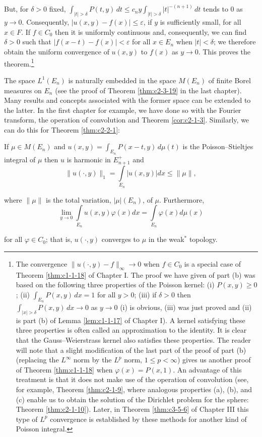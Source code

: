 But, for $\delta > 0$ fixed, $\int_{|t| > \delta} P(t, y) \, dt \leq c_n y \int_{|t| > \delta} |t|^{-(n+1)} \, dt$ tends to 0 as $y \to 0$. Consequently, $|u(x, y) - f(x)| \leq \varepsilon$, if $y$ is sufficiently small, for all $x \in F$. If $f \in C_0$ then it is uniformly continuous and, consequently, we can find $\delta > 0$ such that $|f(x-t) - f(x)| < \varepsilon$ for all $x \in E_n$ when $|t| < \delta$; we therefore obtain the uniform convergence of $u(x, y)$ to $f(x)$ as $y \to 0$. This proves the theorem.\footnote{The convergence $\|u(\cdot, y) - f\|_\infty \to 0$ when $f \in C_0$ is a special case of Theorem \ref{thm:c1-1-18} of Chapter I. The proof we have given of part (b) was based on the following three properties of the Poisson kernel: (i) $P(x, y) \geq 0$; (ii) $\int_{E_n} P(x, y) \, dx = 1$ for all $y > 0$; (iii) if $\delta > 0$ then $\int_{|x| > \delta} P(x, y) \, dx \to 0$ as $y \to 0$ (i) is obvious, (iii) was just proved and (ii) is part (b) of Lemma \ref{lem:c1-1-17} of Chapter I). A kernel satisfying these three properties is often called an approximation to the identity. It is clear that the Gauss--Weierstrass kernel also satisfies these properties. The reader will note that a slight modification of the last part of the proof of part (b) (replacing the $L^\infty$ norm by the $L^p$ norm, $1 \leq p < \infty$) gives us another proof of Theorem \ref{thm:c1-1-18} when $\varphi(x) = P(x, 1)$. An advantage of this treatment is that it does not make use of the operation of convolution (see, for example, Theorem \ref{thm:c2-1-9}, where analogous properties (a), (b), and (c) enable us to obtain the solution of the Dirichlet problem for the sphere: Theorem \ref{thm:c2-1-10}). Later, in Theorem \ref{thm:c3-5-6} of Chapter III this type of $L^p$ convergence is established by these methods for another kind of Poisson integral.}

The space $L^{1}(E_{n})$ is naturally embedded in the space $M(E_{n})$ of finite Borel measures on $E_{n}$ (see the proof of Theorem \ref{thm:c2-3-19} in the last chapter). Many results and concepts associated with the former space can be extended to the latter. In the first chapter for example, we have done so with the Fourier transform, the operation of convolution and Theorem \ref{cor:c2-1-3}. Similarly, we can do this for Theorem \ref{thm:c2-2-1}:

\begin{theorem}
\label{thm:c2-2-3}
If $\mu \in M(E_n)$ and $u(x, y) = \int_{E_n} P(x - t, y) \, d\mu(t)$ is the Poisson--Stieltjes integral of $\mu$ then $u$ is harmonic in $E_{n+1}^{+}$ and
\begin{equation}\label{eq:c2-2-4}
\|u(\cdot,y)\|_{1}=\int\limits_{E_{n}}|u(x,y)|d x\leq\|\mu\|,
\end{equation}

where $\|\mu\|$ is the total variation, $|\mu|(E_{n})$, of $\mu$. Furthermore,
\[
\lim_{y\to0}\int\limits_{E_{n}}u(x,y)\varphi(x)dx=\int\limits_{E_{n}}\varphi(x)d\mu(x)
\]

for all $\varphi \in C_0$; that is, $u(\cdot, y)$ converges to $\mu$ in the weak$^{*}$ topology.
\end{theorem}

